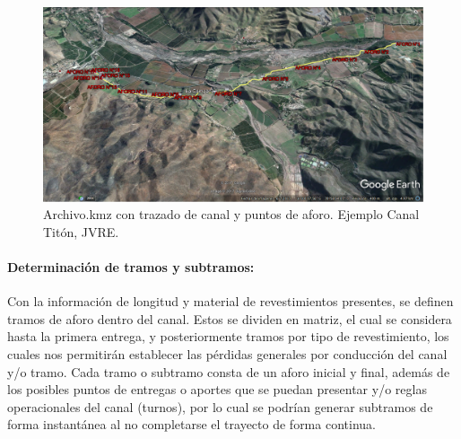 \documentclass[]{article}
\begin{document}
\begin{figure}[H]
\centering
\includegraphics[width=\textwidth]{images/puntos_de_aforo_kml2.eps}
\caption{Archivo.kmz con trazado de canal y puntos de aforo. Ejemplo Canal Titón, JVRE.}
\label{kmz}
\end{figure}

\paragraph{Determinación de tramos y subtramos:} Con la información de longitud y material de revestimientos presentes, se definen tramos de aforo dentro del canal. Estos se dividen en matriz, el cual se considera hasta la primera entrega, y posteriormente tramos por tipo de revestimiento, los cuales nos permitirán establecer las pérdidas generales por conducción del canal y/o tramo. Cada tramo o subtramo consta de un aforo inicial y final, además de los posibles puntos de entregas o aportes que se puedan presentar y/o reglas operacionales del canal (turnos), por lo cual se podrían generar subtramos de forma instantánea al no completarse el trayecto de forma continua.
\end{document}
